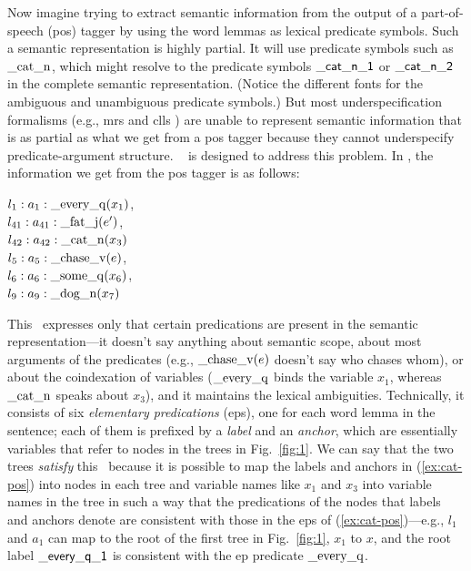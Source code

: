Now imagine trying to extract semantic information from the output of
a part-of-speech ({\sc pos}) tagger by using the word lemmas as
lexical predicate symbols.  Such a semantic representation is highly
partial.  It will use predicate symbols such as $\mathrm{\_cat\_n}$,
which might resolve to the predicate symbols $\mathsf{\_cat\_n\_1}$ or
$\mathsf{\_cat\_n\_2}$ in the complete semantic representation.  (Notice
the different fonts for the ambiguous and unambiguous predicate
symbols.)  But most underspecification formalisms (e.g., {\sc mrs}
\cite{copestake:etal:2005} and {\sc clls} \cite{egg:etal:2001}) are
unable to represent semantic information that is as partial as what we
get from a {\sc pos} tagger because they cannot underspecify
predicate-argument structure.  \rmrs\ \cite{copestake:2007a} is 
designed to address this problem.  In \rmrs, the
information we get from the {\sc pos} tagger is as follows:

\begin{examples}
\item \label{ex:cat-pos}
$l_1:a_1:\mathrm{\_every\_q}(x_1)$, \\
$l_{41}:a_{41}:\mathrm{\_fat\_j}(e')$,\\
$l_{42}:a_{42}:\mathrm{\_cat\_n}(x_3)$\\
$l_5:a_5:\mathrm{\_chase\_v}(e)$, \\
$l_6:a_6:\mathrm{\_some\_q}(x_6)$, \\
$l_9:a_9:\mathrm{\_dog\_n}(x_7)$
\end{examples}

This \rmrs\ expresses only that certain predications are present in
the semantic representation---it doesn't say anything about
semantic scope, about most arguments of the
predicates (e.g., $\mathrm{\_chase\_v}(e)$ doesn't say who chases
whom), or about the coindexation of variables ($\mathrm{\_every\_q}$
binds the variable $x_1$, whereas $\mathrm{\_cat\_n}$ speaks about
$x_3$), and it maintains the lexical ambiguities.  Technically, it
consists of six \emph{elementary predications} ({\sc ep}s), one for
each word lemma in the sentence; each of them is prefixed by a
\emph{label} and an \emph{anchor}, which are essentially variables
that refer to nodes in the trees in Fig.~\ref{fig:1}.  We can say that
the two trees \emph{satisfy} this \rmrs\ because it is possible to map
the labels and anchors in (\ref{ex:cat-pos}) into nodes in each tree
and variable names like 
$x_1$ and $x_3$ into variable names in the tree in such a way that the
predications of the nodes that labels and anchors denote are 
consistent with those in the {\sc ep}s of (\ref{ex:cat-pos})---e.g.,
$l_1$ and $a_1$
can map to the root of the first tree in Fig.~\ref{fig:1}, $x_1$ to
$x$, and the root label 
$\mathsf{\_every\_q\_1}$ is consistent with the {\sc ep} predicate
$\mathrm{\_every\_q}$.

